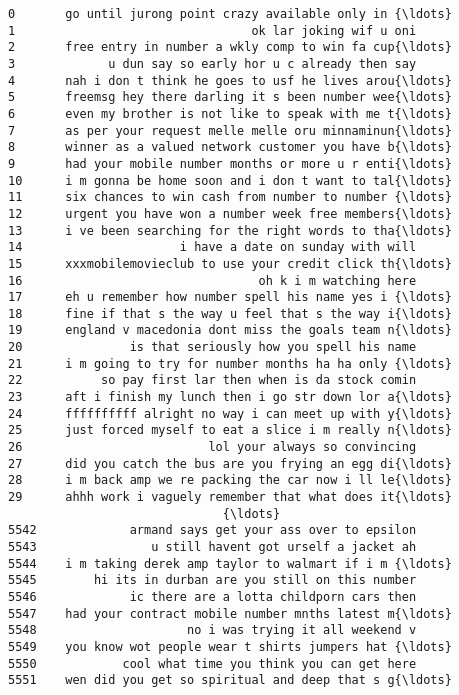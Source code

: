 \documentclass[11pt]{article}
\begin{document}
    \begin{Verbatim}[commandchars=\\\{\}]
0       go until jurong point crazy available only in {\ldots}
1                                 ok lar joking wif u oni
2       free entry in number a wkly comp to win fa cup{\ldots}
3             u dun say so early hor u c already then say
4       nah i don t think he goes to usf he lives arou{\ldots}
5       freemsg hey there darling it s been number wee{\ldots}
6       even my brother is not like to speak with me t{\ldots}
7       as per your request melle melle oru minnaminun{\ldots}
8       winner as a valued network customer you have b{\ldots}
9       had your mobile number months or more u r enti{\ldots}
10      i m gonna be home soon and i don t want to tal{\ldots}
11      six chances to win cash from number to number {\ldots}
12      urgent you have won a number week free members{\ldots}
13      i ve been searching for the right words to tha{\ldots}
14                      i have a date on sunday with will
15      xxxmobilemovieclub to use your credit click th{\ldots}
16                                 oh k i m watching here
17      eh u remember how number spell his name yes i {\ldots}
18      fine if that s the way u feel that s the way i{\ldots}
19      england v macedonia dont miss the goals team n{\ldots}
20               is that seriously how you spell his name
21      i m going to try for number months ha ha only {\ldots}
22           so pay first lar then when is da stock comin
23      aft i finish my lunch then i go str down lor a{\ldots}
24      ffffffffff alright no way i can meet up with y{\ldots}
25      just forced myself to eat a slice i m really n{\ldots}
26                          lol your always so convincing
27      did you catch the bus are you frying an egg di{\ldots}
28      i m back amp we re packing the car now i ll le{\ldots}
29      ahhh work i vaguely remember that what does it{\ldots}
                              {\ldots}                        
5542             armand says get your ass over to epsilon
5543                u still havent got urself a jacket ah
5544    i m taking derek amp taylor to walmart if i m {\ldots}
5545        hi its in durban are you still on this number
5546             ic there are a lotta childporn cars then
5547    had your contract mobile number mnths latest m{\ldots}
5548                     no i was trying it all weekend v
5549    you know wot people wear t shirts jumpers hat {\ldots}
5550            cool what time you think you can get here
5551    wen did you get so spiritual and deep that s g{\ldots}

\end{Verbatim}
\end{document}
